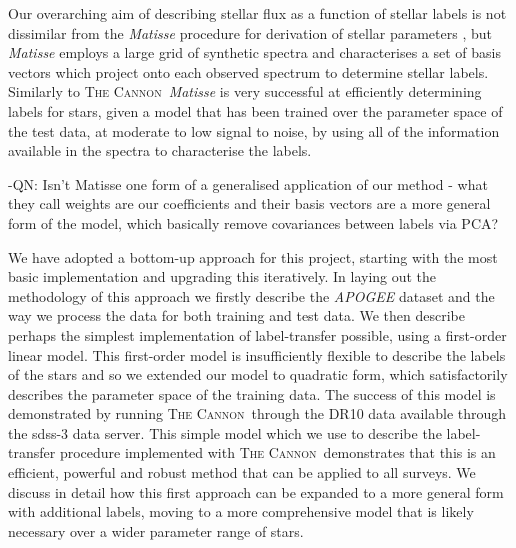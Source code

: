 \documentclass[12pt, preprint]{aastex}
\newcommand{\tc}{\textsc{The Cannon}}
\begin{document}
Our overarching aim of describing stellar flux as a function of stellar labels is not dissimilar from the \textit{Matisse} procedure for derivation of stellar parameters \citep{Reico-Blanco2006}, but \textit{Matisse} employs a large grid of synthetic spectra and characterises a set of basis vectors which project onto each observed spectrum to determine stellar labels. Similarly to \tc\, \textit{Matisse} is very successful at efficiently determining labels for stars, given a model that has been trained over the parameter space of the test data, at moderate to low signal to noise, by using all of the information available in the spectra to characterise the labels. 

-QN: Isn't Matisse one form of a generalised application of our method - what they call weights are our coefficients and their basis vectors are a more general form of the model, which basically remove covariances between labels via PCA? 

We have adopted a bottom-up approach for this project, starting with the most basic implementation and upgrading this iteratively.  In laying out the methodology of this approach we firstly describe the \textit{APOGEE} dataset and the way we process the data for both training and test data. We then describe perhaps the simplest implementation of label-transfer possible, using a first-order linear model. This first-order model is insufficiently flexible to describe the labels of the stars and so we extended our model to quadratic form, which satisfactorily describes the parameter space of the training data. The success of this model is demonstrated by running \tc\ through the DR10 data available through the sdss-3 data server. This simple model which we use to describe the label-transfer procedure implemented with  \tc\, demonstrates that this is an efficient, powerful and robust method that can be applied to all surveys. We discuss in detail how this first approach can be expanded to a more general form with additional labels, moving to a more comprehensive model that is likely necessary over a wider parameter range of stars. 

\end{document}
